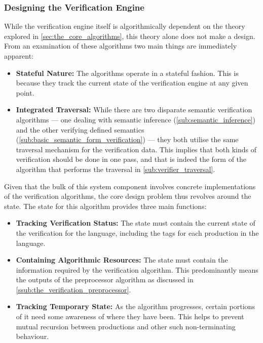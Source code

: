 
\subsubsection{Designing the Verification Engine} %
\label{ssub:designing_the_verification_engine}

While the verification engine itself is algorithmically dependent on the theory explored in \autoref{sec:the_core_algorithms}, this theory alone does not make a design. 
From an examination of these algorithms two main things are immediately apparent:
\begin{itemize}
    \item \textbf{Stateful Nature:} The algorithms operate in a stateful fashion.
    This is because they track the current state of the verification engine at any given point.
    \item \textbf{Integrated Traversal:} While there are two disparate semantic verification algorithms --- one dealing with semantic inference (\autoref{sub:semantic_inference}) and the other verifying defined semantics (\autoref{sub:basic_semantic_form_verification}) --- they both utilise the same traversal mechanism for the verification data. 
    This implies that both kinds of verification should be done in one pass, and that is indeed the form of the algorithm that performs the traversal in \autoref{sub:verifier_traversal}. 
\end{itemize}

Given that the bulk of this system component involves concrete implementations of the verification algorithms, the core design problem thus revolves around the state. 
The state for this algorithm provides three main functions:
\begin{itemize}
    \item \textbf{Tracking Verification Status:} The state must contain the current state of the verification for the language, including the tags for each production in the language.
    \item \textbf{Containing Algorithmic Resources:} The state must contain the information required by the verification algorithm.
    This predominantly means the outputs of the preprocessor algorithm as discussed in \autoref{ssub:the_verification_preprocessor}.
    \item \textbf{Tracking Temporary State:} As the algorithm progresses, certain portions of it need some awareness of where they have been.
    This helps to prevent mutual recursion between productions and other such non-terminating behaviour. 
\end{itemize}

